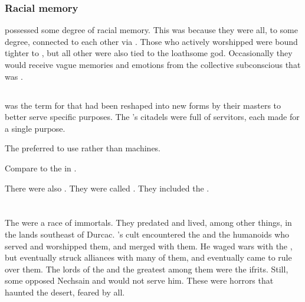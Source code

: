 \subsubsection{Racial memory}
\Humans possessed some degree of racial memory. 
This was because they were all, to some degree, connected to each other via \Lithrim.
Those who actively worshipped \Iquin were bound tighter to \Lithrim, but all other \humans were also tied to the loathsome god. 
Occasionally they would receive vague memories and emotions from the collective subconscious that was \Lithrim. 









\subsection{\Shapens}
\index{\shapen}
 was the term for \humans that had been reshaped into new forms by their \resphan masters to better serve specific purposes. 
The \resphain's citadels were full of \shapen servitors, each made for a single purpose.

The \resphain preferred to use \shapen rather than machines. 

Compare to the  in \cite{GrahamMcNeill:Mechanicum}.

There were also \resphan \shapen. 
They were called . 
They included the .















\section{\Jinni}
\index{\jinni}
The \jinn were a race of immortals.
They predated \humans and lived, among other things, in the lands southeast of Durcac. 
\Secherdamon's cult encountered the \jinn and the humanoids who served and worshipped them, and merged with them.
He waged wars with the \jinn, but eventually struck alliances with many of them, and eventually came to rule over them.
The lords of the \jinn and the greatest among them were the ifrits.
Still, some \jinn opposed Nechsain and would not serve him. 
These  \jinn were horrors that haunted the desert, feared by all.

